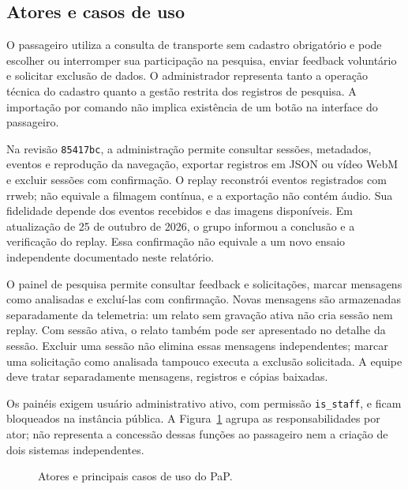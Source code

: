 \documentclass[12pt,oneside,a4paper,brazil,chapter=TITLE]{abntex2}
\let\papsection\section
\renewcommand{\section}{\clearpage\papsection}
\begin{document}
\begin{apendicesenv}
\section{Atores e casos de uso}
O passageiro utiliza a consulta de transporte sem cadastro obrigatório e pode escolher ou interromper sua participação na pesquisa, enviar feedback voluntário e solicitar exclusão de dados. O administrador representa tanto a operação técnica do cadastro quanto a gestão restrita dos registros de pesquisa. A importação por comando não implica existência de um botão na interface do passageiro.

Na revisão \texttt{85417bc}, a administração permite consultar sessões, metadados, eventos e reprodução da navegação, exportar registros em JSON ou vídeo WebM e excluir sessões com confirmação. O replay reconstrói eventos registrados com rrweb; não equivale a filmagem contínua, e a exportação não contém áudio. Sua fidelidade depende dos eventos recebidos e das imagens disponíveis. Em atualização de 25 de outubro de 2026, o grupo informou a conclusão e a verificação do replay. Essa confirmação não equivale a um novo ensaio independente documentado neste relatório.

O painel de pesquisa permite consultar feedback e solicitações, marcar mensagens como analisadas e excluí-las com confirmação. Novas mensagens são armazenadas separadamente da telemetria: um relato sem gravação ativa não cria sessão nem replay. Com sessão ativa, o relato também pode ser apresentado no detalhe da sessão. Excluir uma sessão não elimina essas mensagens independentes; marcar uma solicitação como analisada tampouco executa a exclusão solicitada. A equipe deve tratar separadamente mensagens, registros e cópias baixadas.

Os painéis exigem usuário administrativo ativo, com permissão \texttt{is\_staff}, e ficam bloqueados na instância pública. A Figura~\ref{fig:casos-pap} agrupa as responsabilidades por ator; não representa a concessão dessas funções ao passageiro nem a criação de dois sistemas independentes.

\begin{figure}[H]
\centering\resizebox{\textwidth}{!}{}
\caption{Atores e principais casos de uso do PaP.}\label{fig:casos-pap}
\end{figure}


\end{apendicesenv}
\end{document}
